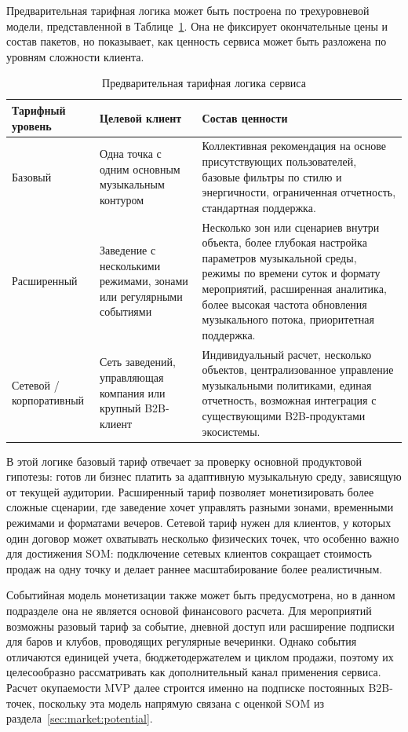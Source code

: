 Предварительная тарифная логика может быть построена по трехуровневой модели, представленной в Таблице~\ref{tab:service:tariffs}. Она не фиксирует окончательные цены и состав пакетов, но показывает, как ценность сервиса может быть разложена по уровням сложности клиента.

\begin{table}[htbp]
\centering
\small
\caption{Предварительная тарифная логика сервиса}
\label{tab:service:tariffs}
\begin{tabularx}{\textwidth}{p{}p{}X}
\toprule
Тарифный уровень & Целевой клиент & Состав ценности \\
\midrule
Базовый & Одна точка с одним основным музыкальным контуром & Коллективная рекомендация на основе присутствующих пользователей, базовые фильтры по стилю и энергичности, ограниченная отчетность, стандартная поддержка. \\
\addlinespace
Расширенный & Заведение с несколькими режимами, зонами или регулярными событиями & Несколько зон или сценариев внутри объекта, более глубокая настройка параметров музыкальной среды, режимы по времени суток и формату мероприятий, расширенная аналитика, более высокая частота обновления музыкального потока, приоритетная поддержка. \\
\addlinespace
Сетевой / корпоративный & Сеть заведений, управляющая компания или крупный B2B-клиент & Индивидуальный расчет, несколько объектов, централизованное управление музыкальными политиками, единая отчетность, возможная интеграция с существующими B2B-продуктами экосистемы. \\
\bottomrule
\end{tabularx}
\end{table}

В этой логике базовый тариф отвечает за проверку основной продуктовой гипотезы: готов ли бизнес платить за адаптивную музыкальную среду, зависящую от текущей аудитории. Расширенный тариф позволяет монетизировать более сложные сценарии, где заведение хочет управлять разными зонами, временными режимами и форматами вечеров. Сетевой тариф нужен для клиентов, у которых один договор может охватывать несколько физических точек, что особенно важно для достижения SOM: подключение сетевых клиентов сокращает стоимость продаж на одну точку и делает раннее масштабирование более реалистичным.

Событийная модель монетизации также может быть предусмотрена, но в данном подразделе она не является основой финансового расчета. Для мероприятий возможны разовый тариф за событие, дневной доступ или расширение подписки для баров и клубов, проводящих регулярные вечеринки. Однако события отличаются единицей учета, бюджетодержателем и циклом продажи, поэтому их целесообразно рассматривать как дополнительный канал применения сервиса. Расчет окупаемости MVP далее строится именно на подписке постоянных B2B-точек, поскольку эта модель напрямую связана с оценкой SOM из раздела~\ref{sec:market:potential}.

